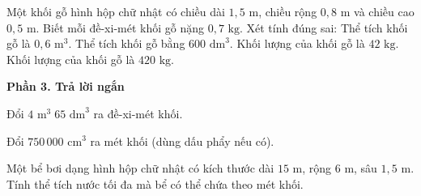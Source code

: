 \begin{ex} %
Một khối gỗ hình hộp chữ nhật có chiều dài $1{,}5\text{ m}$, chiều rộng $0{,}8\text{ m}$ và chiều cao $0{,}5\text{ m}$. Biết mỗi đề-xi-mét khối gỗ nặng $0{,}7\text{ kg}$. Xét tính đúng sai:
\choiceTF
{\True Thể tích khối gỗ là $0{,}6\text{ m}^3$.}
{\True Thể tích khối gỗ bằng $600\text{ dm}^3$.}
{Khối lượng của khối gỗ là $42\text{ kg}$.}
{\True Khối lượng của khối gỗ là $420\text{ kg}$.}
\end{ex}

\textbf{Phần 3. Trả lời ngắn}

\begin{ex} %
Đổi $4\text{ m}^3\; 65\text{ dm}^3$ ra đề-xi-mét khối.
\end{ex}

\begin{ex} %
Đổi $750\,000\text{ cm}^3$ ra mét khối (dùng dấu phẩy nếu có).
\end{ex}

\begin{ex} %
Một bể bơi dạng hình hộp chữ nhật có kích thước dài $15\text{ m}$, rộng $6\text{ m}$, sâu $1{,}5\text{ m}$. Tính thể tích nước tối đa mà bể có thể chứa theo mét khối.
\end{ex}

